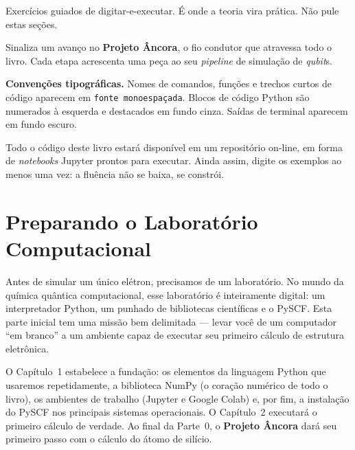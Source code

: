 \documentclass[11pt,a4paper,openany]{book}
\newcommand{\code}[1]{\texttt{#1}}
\newcommand{\pyscf}{\textsf{PySCF}}
\newcommand{\numpy}{\textsf{NumPy}}
\newcommand{\python}{\textsf{Python}}
\newcommand{\qubit}{\emph{qubit}}
\begin{document}
\begin{caixamaos}
Exercícios guiados de digitar-e-executar. É onde a teoria vira prática.
Não pule estas seções.
\end{caixamaos}

\begin{caixaancora}
Sinaliza um avanço no \textbf{Projeto Âncora}, o fio condutor que atravessa todo
o livro. Cada etapa acrescenta uma peça ao seu \emph{pipeline} de simulação de
\qubit{}s.
\end{caixaancora}

\noindent\textbf{Convenções tipográficas.} Nomes de comandos, funções e trechos
curtos de código aparecem em \code{fonte monoespaçada}. Blocos de código \python{}
são numerados à esquerda e destacados em fundo cinza. Saídas de terminal
aparecem em fundo escuro.

\begin{caixadica}
Todo o código deste livro estará disponível em um repositório on-line, em forma
de \emph{notebooks} Jupyter prontos para executar. Ainda assim, digite os
exemplos ao menos uma vez: a fluência não se baixa, se constrói.
\end{caixadica}

\cleardoublepage
\tableofcontents

\mainmatter
\pagestyle{fancy}

\setcounter{part}{-1}
\part{Preparando o Laboratório Computacional}

\noindent
Antes de simular um único elétron, precisamos de um laboratório. No mundo da
química quântica computacional, esse laboratório é inteiramente digital: um
interpretador \python{}, um punhado de bibliotecas científicas e o \pyscf{}. Esta
parte inicial tem uma missão bem delimitada --- levar você de um computador
``em branco'' a um ambiente capaz de executar seu primeiro cálculo de estrutura
eletrônica.

\vspace{0.3cm}
\noindent
O Capítulo~1 estabelece a fundação: os elementos da linguagem \python{} que
usaremos repetidamente, a biblioteca \numpy{} (o coração numérico de todo o
livro), os ambientes de trabalho (Jupyter e Google Colab) e, por fim, a
instalação do \pyscf{} nos principais sistemas operacionais. O Capítulo~2
executará o primeiro cálculo de verdade. Ao final da Parte~0, o
\textbf{Projeto Âncora} dará seu primeiro passo com o cálculo do átomo de
silício.
\end{document}
